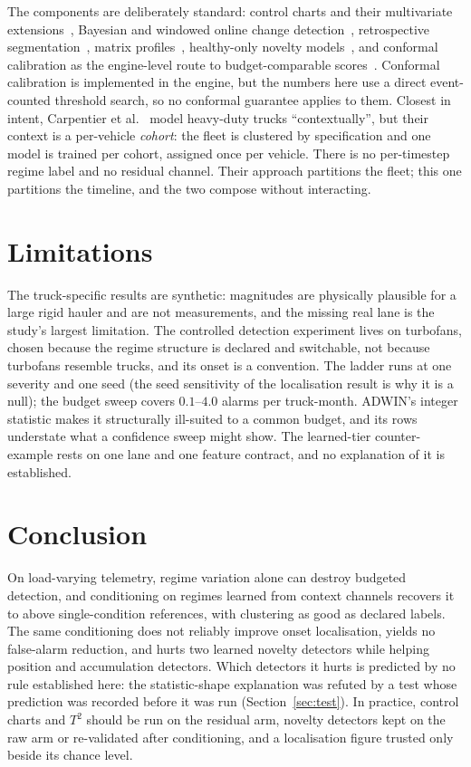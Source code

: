 \documentclass[journal]{IEEEtran}
\begin{document}
The components are deliberately standard: control charts and their multivariate
extensions~\cite{shewhart1931,page1954,roberts1959,hotelling1947,jackson1979,kourti1996,westerhuis2000},
Bayesian and windowed online change detection~\cite{adams2007,bifet2007,raab2020}, retrospective
segmentation~\cite{killick2012}, matrix profiles~\cite{yeh2017}, healthy-only novelty
models~\cite{liu2008,scholkopf2001,sakurada2014}, and conformal calibration as the engine-level route to
budget-comparable scores~\cite{vovk2005,gibbs2021}. Conformal calibration is implemented in the engine, but
the numbers here use a direct event-counted threshold search, so no conformal guarantee applies to them.
Closest in intent, Carpentier et al.~\cite{carpentier2024} model heavy-duty trucks ``contextually'', but
their context is a per-vehicle \emph{cohort}: the fleet is clustered by specification and one model is
trained per cohort, assigned once per vehicle. There is no per-timestep regime label and no residual
channel. Their approach partitions the fleet; this one partitions the timeline, and the two compose without
interacting.

\section{Limitations}

The truck-specific results are synthetic: magnitudes are physically plausible for a large rigid hauler
and are not measurements, and the missing real lane is the study's largest limitation. The controlled
detection experiment lives on turbofans, chosen because the regime structure is declared and
switchable, not because turbofans resemble trucks, and its onset is a convention. The ladder runs at one
severity and one seed (the seed sensitivity of the localisation result is why it is a null); the budget
sweep covers $0.1$--$4.0$ alarms per truck-month. ADWIN's integer statistic makes it structurally
ill-suited to a common budget, and its rows understate what a confidence sweep might show. The learned-tier
counter-example rests on one lane and one feature contract, and no explanation of it is established.

\section{Conclusion}

On load-varying telemetry, regime variation alone can destroy budgeted detection, and conditioning on
regimes learned from context channels recovers it to above single-condition references, with clustering
as good as declared labels. The same conditioning does not reliably improve onset localisation, yields no
false-alarm reduction, and hurts two learned novelty detectors while helping position and accumulation
detectors. Which detectors it hurts is predicted by no rule established here: the statistic-shape
explanation was refuted by a test whose prediction was recorded before it was run
(Section~\ref{sec:test}). In practice, control charts and $T^2$ should be run on the residual arm, novelty
detectors kept on the raw arm or re-validated after conditioning, and a localisation figure trusted only
beside its chance level.
\end{document}
